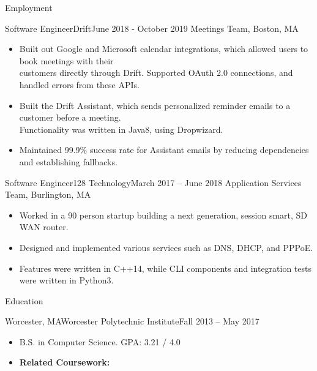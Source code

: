 \documentclass[]{mcdowellcv}
\begin{document}
\begin{cvsection}{Employment}
		\begin{cvsubsection}{Software Engineer}{Drift}{June 2018 - October 2019}		
			Meetings Team, Boston, MA
			\begin{itemize}
				\item Built out Google and Microsoft calendar integrations, which allowed users to book meetings with their \\ customers directly through Drift.  Supported OAuth 2.0 connections, and handled errors from these APIs.
				\item Built the Drift Assistant, which sends personalized reminder emails to a customer before a meeting.  \\Functionality was written in Java8, using Dropwizard. 
				\item Maintained 99.9\% success rate for Assistant emails by reducing dependencies and establishing fallbacks.
			\end{itemize}
		\end{cvsubsection}
		
		\begin{cvsubsection}{Software Engineer}{128 Technology}{March 2017 – June 2018}
			Application Services Team, Burlington, MA
			\begin{itemize}
				\item Worked in a 90 person startup building a next generation, session smart, SD WAN router.
				\item Designed and implemented various services such as DNS, DHCP, and PPPoE.
				\item Features were written in C++14, while CLI components and integration tests were written in Python3.
			\end{itemize}
		\end{cvsubsection}
	\end{cvsection}
	
	\begin{cvsection}{Education}
		\begin{cvsubsection}{Worcester, MA}{Worcester Polytechnic Institute}{Fall 2013 -- May 2017}
			\begin{itemize}
				\item B.S. in Computer Science. GPA: 3.21 / 4.0
				\item \bf{Related Coursework:} 
			\end{itemize}
		\end{cvsubsection}
	\end{cvsection}
	
\end{document}
